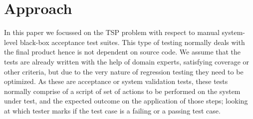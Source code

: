 \documentclass[conference]{IEEEtran}
\begin{document}
%



\section{Approach}
In this paper we focussed on the TSP problem with respect to manual system-level black-box acceptance test suites. This type of testing normally deals with the final product hence is not dependent on source code. We assume that the tests are already written with the help of domain experts, satisfying coverage or other criteria, but due to the very nature of regression testing they need to be optimized. As these are acceptance or system validation tests, these tests normally comprise of a script of set of actions to be performed on the system under test, and the expected outcome on the application of those steps; looking at which tester marks if the test case is a failing or a passing test case. \par
\end{document}
